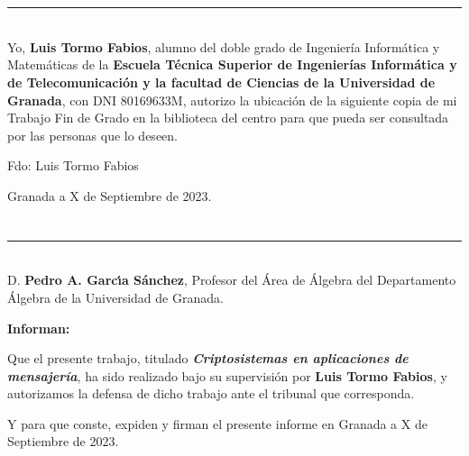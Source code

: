 \chapter*{}
\thispagestyle{empty}

\noindent\rule[-1ex]{\textwidth}{2pt}\\[4.5ex]

Yo, \textbf{Luis Tormo Fabios}, alumno del doble grado de Ingeniería Informática y Matemáticas de la \textbf{Escuela Técnica Superior
de Ingenierías Informática y de Telecomunicación y la facultad de Ciencias de la Universidad de Granada}, con DNI 80169633M, autorizo la
ubicación de la siguiente copia de mi Trabajo Fin de Grado en la biblioteca del centro para que pueda ser
consultada por las personas que lo deseen.

\vspace{6cm}

\noindent Fdo: Luis Tormo Fabios

\vspace{2cm}

\begin{flushright}
Granada a X de Septiembre de 2023.
\end{flushright}


\chapter*{}
\thispagestyle{empty}

\noindent\rule[-1ex]{\textwidth}{2pt}\\[4.5ex]

D. \textbf{Pedro A. Garcı́a Sánchez}, Profesor del Área de Álgebra del Departamento Álgebra de la Universidad de Granada.

\vspace{0.5cm}

\textbf{Informan:}

\vspace{0.5cm}

Que el presente trabajo, titulado \textit{\textbf{Criptosistemas en aplicaciones de mensajería}},
ha sido realizado bajo su supervisión por \textbf{Luis Tormo Fabios}, y autorizamos la defensa de dicho trabajo ante el tribunal
que corresponda.

\vspace{0.5cm}

Y para que conste, expiden y firman el presente informe en Granada a X de Septiembre de 2023.

\vspace{1cm}

